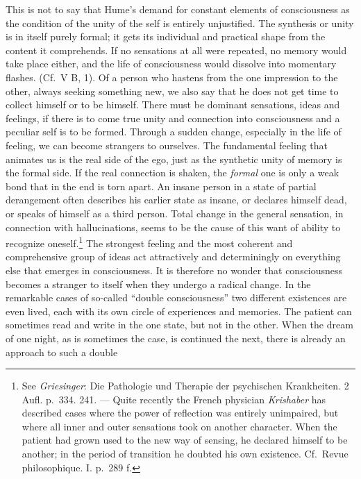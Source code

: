 \documentclass[12pt,a4paper]{book}
\newcommand{\opage}[1]{\marginnote{\footnotesize\textit{[#1]}}}
\begin{document}
This is not to say that Hume's demand for constant elements of
consciousness as the condition of the unity of the self is entirely
unjustified. The synthesis or unity is in itself purely formal; it gets its
individual and practical shape from the content it comprehends. If no
sensations at all were repeated, no memory would take place either, and
the life of consciousness would dissolve into momentary flashes. (Cf.\ V
B, 1). Of a person who hastens from the one impression to the other,
always seeking something new, we also say that he does not get time to
collect himself or to be himself. There must be dominant sensations, ideas
and feelings, if there is to come true unity and connection into
consciousness and a peculiar self is to be formed. Through a sudden
change, especially in the life of feeling, we can become strangers to
ourselves. The fundamental feeling that animates us is the real side of
the ego, just as the synthetic unity of memory is the formal side. If the
real connection is shaken, the \emph{formal} one is only a weak bond that
in the end is torn apart. An insane person in a state of partial
derangement often describes his earlier state as insane, or declares
himself dead, or speaks of himself as a third person.
Total change in
\opage{169}the general sensation, in connection with hallucinations, seems
to be the cause of this want of ability to recognize
oneself.\footnote{See \emph{Griesinger}: Die Pathologie und Therapie der
psychischen Krankheiten. 2 Aufl. p.~334. 241. --- Quite recently the
French physician \emph{Krishaber} has described cases where the power of
reflection was entirely unimpaired, but where all inner and outer
sensations took on another character. When the patient had grown used to
the new way of sensing, he declared himself to be another; in the period
of transition he doubted his own existence. Cf.\ Revue philosophique. I.
p.~289 f.} The strongest feeling and the most coherent and comprehensive
group of ideas act attractively and determiningly on everything else that
emerges in consciousness. It is therefore no wonder that consciousness
becomes a stranger to itself when they undergo a radical change. In the
remarkable cases of so-called ``double consciousness'' two different
existences are even lived, each with its own circle of experiences and
memories. The patient can sometimes read and write in the one state, but
not in the other. When the dream of one night, as is sometimes the case,
is continued the next, there is already an approach to such a double
\end{document}
